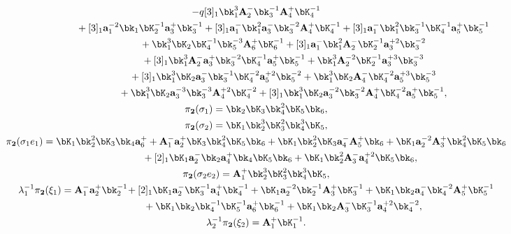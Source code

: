 \begin{gather*}
 - q [3]_1 \bk^{3}_1 {\bf A}^-_2 \bk^{-1}_3 {\bf A}^+_4 \bK^{-1}_4\\
\hphantom{\lambda_2^{-1}\pi_{\bf 1}(\xi_2)=}{}
 + [3]_1 {\bf a}_1^{-2} \bk_1 \bK^{-1}_2 {\bf a}^+_3 \bk^{-1}_3
 + [3]_1 {\bf a}^-_1 \bk^{2}_1 {\bf a}^-_3 \bk^{-2}_3 {\bf A}^+_4 \bK^{-1}_4
 + [3]_1 {\bf a}^-_1 \bk^{2}_1 \bk^{-1}_3 \bK^{-1}_4 {\bf a}^+_5 \bk^{-1}_5\\
\hphantom{\lambda_2^{-1}\pi_{\bf 1}(\xi_2)=}{}
 + \bk^{3}_1 \bK_2 \bK^{-1}_4 \bk^{-3}_5 {\bf A}^+_6 \bK^{-1}_6
 + [3]_1 {\bf a}^-_1 \bk^{2}_1 {\bf A}^-_2 \bK^{-1}_2 {\bf a}_3^{+2} \bk^{-2}_3
\\
\hphantom{\lambda_2^{-1}\pi_{\bf 1}(\xi_2)=}{}
 + [3]_1 \bk^{3}_1 {\bf A}^-_2 {\bf a}^+_3 \bk^{-2}_3 \bK^{-1}_4 {\bf a}^+_5 \bk^{-1}_5
 + \bk^{3}_1 {\bf A}_2^{-2} \bK^{-1}_2 {\bf a}_3^{+3} \bk^{-3}_3
\\
\hphantom{\lambda_2^{-1}\pi_{\bf 1}(\xi_2)=}{}
 + [3]_1 \bk^{3}_1 \bK_2 {\bf a}^-_3 \bk^{-1}_3 \bK^{-2}_4 {\bf a}_5^{+2} \bk^{-2}_5
 + \bk^{3}_1 \bK_2  {\bf A}^-_4 \bK^{-2}_4 {\bf a}_5^{+3} \bk^{-3}_5\\
\hphantom{\lambda_2^{-1}\pi_{\bf 1}(\xi_2)=}{}
 + \bk^{3}_1 \bK_2 {\bf a}_3^{-3} \bk^{-3}_3 {\bf A}_4^{+2} \bK^{-2}_4
 + [3]_1 \bk^{3}_1 \bK_2 {\bf a}_3^{-2} \bk^{-2}_3 {\bf A}^+_4 \bK^{-2}_4 {\bf a}^+_5
\bk^{-1}_5,\\
\pi_{\bf 2}(\sigma_1)=\bk_2 \bK_3 \bk^{2}_4 \bK_5 \bk_6,\\
\pi_{\bf 2}(\sigma_2)=\bK_1 \bk^{3}_2 \bK^{2}_3 \bk^{3}_4 \bK_5,\\
\pi_{\bf 2}(\sigma_1e_1)=\bK_1 \bk^{2}_2 \bK_3 \bk_4 {\bf a}^+_6
 + {\bf A}^-_1 {\bf a}^+_2 \bK_3 \bk^{2}_4 \bK_5 \bk_6
 + \bK_1 \bk^{2}_2 \bK_3 {\bf a}^-_4 {\bf A}^+_5 \bk_6
 + \bK_1 {\bf a}_2^{-2} {\bf A}^+_3 \bk^{2}_4 \bK_5 \bk_6\\
\hphantom{\pi_{\bf 2}(\sigma_1e_1)=}{}
 + [2]_1 \bK_1 {\bf a}^-_2 \bk_2 {\bf a}^+_4 \bk_4 \bK_5 \bk_6
 + \bK_1 \bk^{2}_2 {\bf A}^-_3 {\bf a}_4^{+2} \bK_5 \bk_6,\\
\pi_{\bf 2}(\sigma_2e_2)={\bf A}^+_1 \bk^{3}_2 \bK^{2}_3 \bk^{3}_4 \bK_5,\\
\lambda_1^{-1}\pi_{\bf 2}(\xi_1)={\bf A}^-_1 {\bf a}^+_2 \bk^{-1}_2\!
 + [2]_1 \bK_1 {\bf a}^-_2 \bK^{-1}_3 {\bf a}^+_4 \bk^{-1}_4
 + \bK_1 {\bf a}_2^{-2} \bk^{-1}_2 {\bf A}^+_3 \bK^{-1}_3
 + \bK_1 \bk_2 {\bf a}^-_4 \bk^{-2}_4 {\bf A}^+_5 \bK^{-1}_5\\
\hphantom{\lambda_1^{-1}\pi_{\bf 2}(\xi_1)=}{}
 + \bK_1 \bk_2 \bk^{-1}_4 \bK^{-1}_5 {\bf a}^+_6 \bk^{-1}_6
 + \bK_1 \bk_2 {\bf A}^-_3 \bK^{-1}_3 {\bf a}_4^{+2} \bk^{-2}_4,\\
\lambda_2^{-1}\pi_{\bf 2}(\xi_2)={\bf A}^+_1 \bK^{-1}_1.
\end{gather*}

